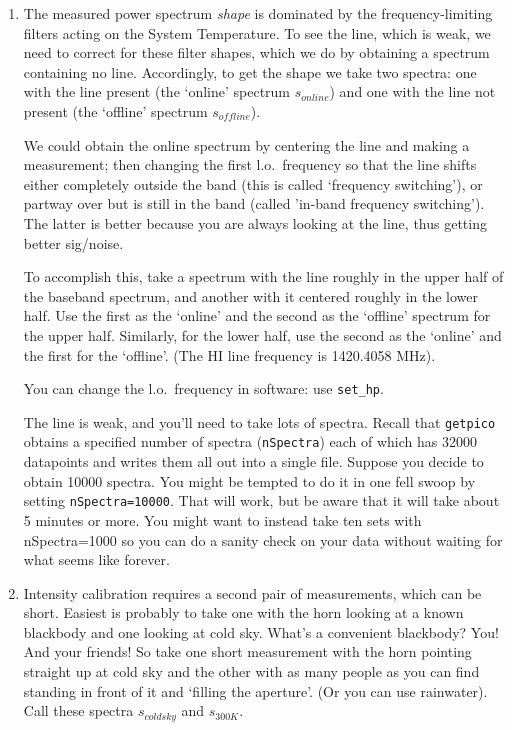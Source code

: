 \documentclass[12pt,preprint]{aastex}
\begin{document}
\begin{enumerate}

\item 
The measured power spectrum {\it shape} is dominated by the
frequency-limiting filters acting on the System Temperature. To see the
line, which is weak, we need to correct for these filter shapes, which
we do by obtaining a spectrum containing no line. Accordingly, to get
the shape we take two spectra: one with the line present (the `online'
spectrum $s_{online}$) and one with the line not present (the `offline'
spectrum $s_{offline}$).

We could obtain the online
  spectrum by centering the line and making a measurement; then changing
  the first l.o.\ frequency so that the line shifts either completely
  outside the band (this is called `frequency switching'), or partway
  over but is still in the band (called 'in-band frequency
  switching'). The latter is better because you are always looking at
  the line, thus getting better sig/noise.

To accomplish this, take a spectrum with the line roughly in the upper
half of the baseband spectrum, and another with it centered roughly in
the lower half. Use the first as the `online' and the second as the
`offline' spectrum for the upper half. Similarly, for the lower half,
use the second as the `online' and the first for the `offline'.  (The HI
line frequency is 1420.4058 MHz).

You can change the l.o.\ frequency in software: use {\tt set\_hp}.

The line is weak, and you'll need to take lots of spectra. Recall that
{\tt getpico} obtains a specified number of spectra ({\tt nSpectra})
each of which has 32000 datapoints and writes them all out into a single
file. Suppose you decide to obtain 10000 spectra. You might be tempted
to do it in one fell swoop by setting {\tt nSpectra=10000}. That
will work, but be aware that it will take about 5 minutes or more. You
might want to instead take ten sets with nSpectra=1000 so you can do a
sanity check on your data without waiting for what seems like forever. 

\item Intensity calibration requires a second pair of measurements,
  which can be short. Easiest is probably to take one with the horn
  looking at a known blackbody and one looking at cold sky. What's a
  convenient blackbody? You! And your friends! So take one short
  measurement with the horn pointing straight up at cold sky and the
  other with as many people as you can find standing in front of it and
  `filling the aperture'. (Or you can use rainwater). Call these spectra
  $s_{coldsky}$ and $s_{300K}$.

\end{enumerate}
\end{document}
